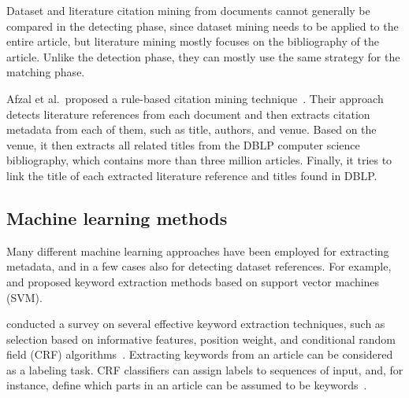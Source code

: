 \documentclass{IOS-Book-Article}
\newcommand{\dara}{\textsf{da\textbar ra}}
\begin{document}
Dataset and literature citation mining from documents cannot generally be compared in the detecting phase, since dataset mining needs to be applied to the entire article, but literature mining mostly focuses on the bibliography of the article. %
Unlike the detection phase, they can mostly use the same strategy for the matching phase. 

Afzal et al.\ proposed a rule-based citation mining technique~\cite{Afzal2010}.
Their approach detects literature references from each document and then extracts citation metadata from each of them, such as title, authors, and venue. Based on the venue, it then extracts all related titles from the DBLP computer science bibliography, which contains more than three million articles.
Finally, it tries to link the title of each extracted literature reference and titles found in DBLP.

\subsection{Machine learning methods}
Many different machine learning approaches have been employed for extracting metadata, and in a few cases also for detecting dataset references.
For example, \citeauthor{Zhang2006} \cite{Zhang2006} and \citeauthor{Han2003} \cite{Han2003} proposed keyword extraction methods based on support vector machines (SVM). 

\citeauthor{Kaur2010} conducted a survey on several effective keyword extraction techniques, such as selection based on informative features, position weight, and conditional random field (CRF) algorithms~\cite{Kaur2010}.
Extracting keywords from an article can be considered as a labeling task.
CRF classifiers can assign labels to sequences of input, and, for instance, define which parts in an article can be assumed to be keywords~\citep{ZHANG2008}.
\end{document}
